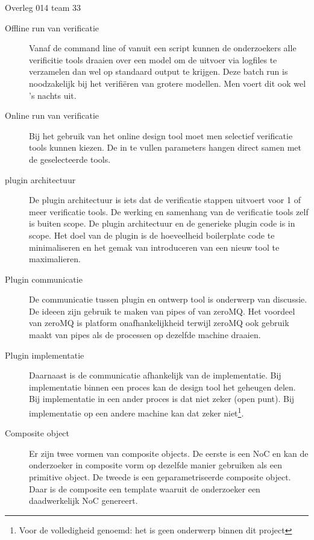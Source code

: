 \documentclass[a4paper,final]{article}
\begin{document}
\begin{Minutes}{Overleg 014 team 33}
\begin{description} 

	\item[Offline run van verificatie] Vanaf de command line of vanuit een
		script kunnen de onderzoekers alle verificitie tools draaien over een
		model om de uitvoer via logfiles te verzamelen dan wel op standaard
		output te krijgen. Deze batch run is noodzakelijk bij het
		verifi\"{e}ren van grotere modellen. Men voert dit ook wel 's nachts
		uit.

	\item[Online run van verificatie] Bij het gebruik van het online design
		tool moet men selectief verificatie tools kunnen kiezen.  De in te
		vullen parameters hangen direct samen met de geselecteerde tools.
		
	\item[plugin architectuur] De plugin architectuur is iets dat de
		verificatie stappen uitvoert voor 1 of meer verificatie tools. De
		werking en samenhang van de verificatie tools zelf is buiten scope. De
		plugin architectuur en de generieke plugin code is in scope. Het doel
		van de plugin is de hoeveelheid boilerplate code te minimaliseren en
		het gemak van introduceren van een nieuw tool te maximalieren.

	\item[Plugin communicatie] De communicatie tussen plugin en ontwerp tool is
		onderwerp van discussie. De ideeen zijn gebruik te maken van pipes of
		van zeroMQ. Het voordeel van zeroMQ is platform onafhankelijkheid
		terwijl zeroMQ ook gebruik maakt van pipes als de processen op dezelfde
		machine draaien.

	\item[Plugin implementatie]	Daarnaast is de communicatie afhankelijk van de
		implementatie. Bij implementatie binnen een proces kan de design tool
		het geheugen delen. Bij implementatie in een ander proces is dat niet
		zeker (open punt). Bij implementatie op een andere machine kan dat
		zeker niet\footnote{Voor de volledigheid genoemd: het is geen onderwerp
		binnen dit project}.

	\item[Composite object] Er zijn twee vormen van composite objects. De
		eerste is een NoC en kan de onderzoeker in composite vorm op dezelfde
		manier gebruiken als een primitive object. De tweede is een
		geparametriseerde composite object. Daar is de composite een template
		waaruit de onderzoeker een daadwerkelijk NoC genereert. 


\end{description}
\end{Minutes}
\end{document}

